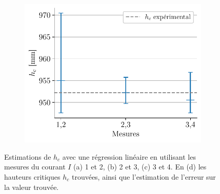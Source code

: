 \begin{figure}[H]
\begin{subfigure}{0.48\linewidth}
        \centering
        \includegraphics[width=\linewidth]{figures/hc_results_I.pdf}
        \caption{}
        \label{fig:hc_I}
    \end{subfigure}
    \caption{Estimations de \(h_c\) avec une régression linéaire en utilisant les mesures du courant $I$ (a) 1 et 2, (b) 2 et 3, (c) 3 et 4. En (d) les hauteurs critiques \(h_c\) trouvées, ainsi que l'estimation de l'erreur sur la valeur trouvée.}
    \label{fig:hc_intensite}
\end{figure}

